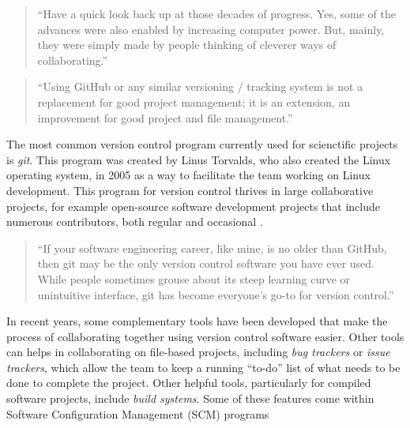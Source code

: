 \documentclass[]{tufte-book}
\begin{document}
\begin{quote}
``Have a quick look back up at those decades of progress. Yes, some of the
advances were also enabled by increasing computer power. But, mainly, they were
simply made by people thinking of cleverer ways of collaborating.''
\citep{irving2011astonishments}
\end{quote}

\begin{quote}
``Using GitHub or any similar versioning / tracking system is not a replacement
for good project management; it is an extension, an improvement for good
project and file management.'' \citep{perez2016ten}
\end{quote}

The most common version control program currently used for scienctific projects is
\emph{git}. This program was created by Linus Torvalds, who also created the Linux
operating system, in 2005 as a way to facilitate the team working on Linux
development. This program for version control thrives in large collaborative
projects, for example open-source software development projects that include
numerous contributors, both regular and occasional \citep{brown2018git}.

\begin{quote}
``If your software engineering career, like mine, is no older than GitHub, then
git may be the only version control software you have ever used. While people
sometimes grouse about its steep learning curve or unintuitive interface, git has
become everyone's go-to for version control.'' \citep{target2018version}
\end{quote}

In recent years, some complementary tools have been developed that make the process of
collaborating together using version control software easier.
Other tools can helps in collaborating on file-based projects, including \emph{bug trackers}
or \emph{issue trackers}, which allow the team to keep a running ``to-do'' list of what needs
to be done to complete the project. Other helpful tools, particularly for compiled
software projects, include \emph{build systems}. Some of these features come within
Software Configuration Management (SCM) programs \citep{raymondunderstanding}
\end{document}
